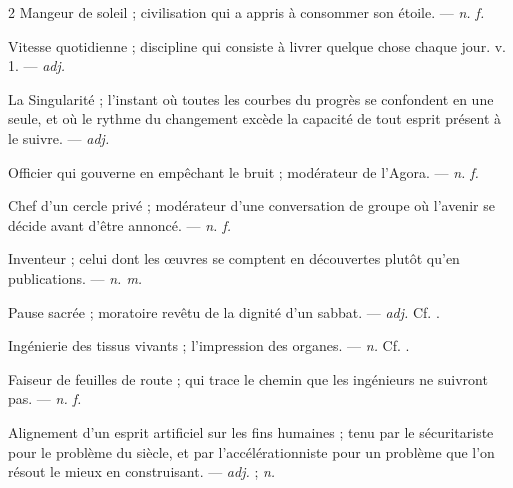 \begin{multicols}{2}
 Mangeur de soleil ; civilisation qui a appris à consommer son étoile. —  \textit{n. f.}

 Vitesse quotidienne ; discipline qui consiste à livrer quelque chose chaque jour.   v. 1. —  \textit{adj.}

 La Singularité ; l'instant où toutes les courbes du progrès se confondent en une seule, et où le rythme du changement excède la capacité de tout esprit présent à le suivre. —  \textit{adj.}

 Officier qui gouverne en empêchant le bruit ; modérateur de l'Agora. —  \textit{n. f.}

 Chef d'un cercle privé ; modérateur d'une conversation de groupe où l'avenir se décide avant d'être annoncé. —  \textit{n. f.}

 Inventeur ; celui dont les œuvres se comptent en découvertes plutôt qu'en publications. —  \textit{n. m.}

 Pause sacrée ; moratoire revêtu de la dignité d'un sabbat.   —  \textit{adj.} Cf. .

 Ingénierie des tissus vivants ; l'impression des organes. —  \textit{n.} Cf. .

 Faiseur de feuilles de route ; qui trace le chemin que les ingénieurs ne suivront pas.  —  \textit{n. f.}

 Alignement d'un esprit artificiel sur les fins humaines ; tenu par le sécuritariste pour le problème du siècle, et par l'accélérationniste pour un problème que l'on résout le mieux en construisant. —  \textit{adj.} ;  \textit{n.}


\end{multicols}
